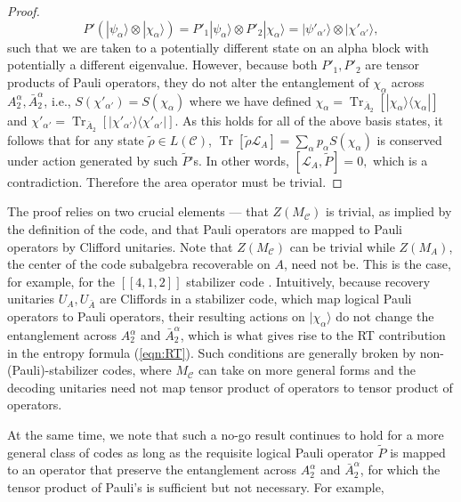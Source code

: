 \documentclass[a4paper,11pt]{article}
\theoremstyle{definition}
\numberwithin{equation}{section}
\DeclareMathOperator{\Tr}{Tr}
\begin{document}
\begin{proof}
 \begin{equation}
     P' (|\psi_{\alpha}\rangle\otimes |\chi_{\alpha}\rangle) = P'_1 |\psi_{\alpha}\rangle\otimes P'_2|\chi_{\alpha}\rangle=|\psi'_{\alpha'}\rangle\otimes |\chi'_{\alpha'}\rangle,
     \label{eqn:Pprime}
 \end{equation}
 such that we are taken to a potentially different state on an alpha block with potentially a different eigenvalue. However, because both $P'_1, P'_2$ are tensor products of Pauli operators, they do not alter the entanglement of $\chi_{\alpha}$ across $A_2^{\alpha},\bar{A}_2^{\alpha}$, i.e., $S(\chi'_{\alpha'})=S(\chi_{\alpha})$ where we have defined $\chi_{\alpha}=\Tr_{\bar{A}_2}[|\chi_{\alpha}\rangle\langle\chi_{\alpha}|]$ and $\chi'_{\alpha'}=\Tr_{\bar{A}_2}[|\chi'_{\alpha'}\rangle\langle\chi'_{\alpha'}|]$.
As this holds for all of the above basis states, it follows that for any state $\tilde{\rho}\in L(\mathcal{C})$, $\Tr[\tilde{\rho}\mathcal{L}_A]=\sum_{\alpha}p_{\alpha}S(\chi_{\alpha})$ is conserved under action generated by such $\tilde{P}$'s. In other words,
$[\mathcal{L}_A,\tilde{P}] =0,$ which is a contradiction. Therefore the area operator must be trivial.
\end{proof}


The proof relies on two crucial elements --- that $Z(M_{\mathcal{C}})$ is trivial, as implied by the definition of the code,  and that Pauli operators are mapped to Pauli operators by Clifford unitaries. 
Note that $Z(M_{\mathcal{C}})$ can be trivial while $Z(M_A)$, the center of the code subalgebra recoverable on $A$, need not be. This is the case, for example, for the $[[4,1,2]]$ stabilizer code \cite{Cao:2020ksw}. 
Intuitively, 
because recovery unitaries $U_{A},U_{\bar{A}}$ are Cliffords in a stabilizer code, which map logical Pauli operators to Pauli operators, their resulting actions on $|\chi_{\alpha}\rangle$ do not change the entanglement across  $A_2^{\alpha}$ and $\bar{A}_2^{\alpha}$, which is what gives rise to the RT contribution in the entropy formula (\ref{eqn:RT}). Such conditions are generally broken by non-(Pauli)-stabilizer codes, where $M_{\mathcal{C}}$ can take on more general forms and the decoding unitaries need not map tensor product of operators to tensor product of operators. 

At the same time, we note that such a no-go result continues to hold for a more general class of codes as long as the requisite logical Pauli operator $\tilde{P}$ is mapped to an operator that preserve the entanglement across $A_2^{\alpha}$ and $\bar{A}_2^{\alpha}$, for which the tensor product of Pauli's is sufficient but not necessary. For example, 
\end{document}
